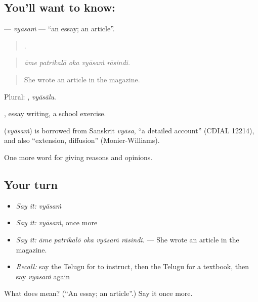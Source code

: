 \subsection*{You'll want to know: }
\textbf{} — \emph{vyāsaṁ} — \textquotedblleft{}an essay; an article\textquotedblright{}.

\begin{quote}
    .
\end{quote}

\begin{quote}
\emph{āme patrikalō oka vyāsaṁ rāsindi.}
\end{quote}

\begin{quote}
She wrote an article in the magazine.
\end{quote}

Plural: , \emph{vyāsālu}.

, essay writing, a school exercise.

\begin{cousinweb}
\textbf{} (\emph{vyāsaṁ}) is borrowed from Sanskrit \emph{vyāsa}, \textquotedblleft{}a detailed account\textquotedblright{} (CDIAL 12214), and also \textquotedblleft{}extension, diffusion\textquotedblright{} (Monier-Williams).
\end{cousinweb}

\begin{grammarlens}[title={What you've built}]
One more word for giving reasons and opinions.
\end{grammarlens}

\subsection*{Your turn}
\begin{itemize}
\raggedright
  \item \emph{Say it:} \emph{vyāsaṁ}
  \item \emph{Say it:} \emph{vyāsaṁ}, once more
  \item \emph{Say it:} \emph{āme patrikalō oka vyāsaṁ rāsindi.} — She wrote an article in the magazine.
  \item \emph{Recall:} say the Telugu for to instruct, then the Telugu for a textbook, then say \emph{vyāsaṁ} again
\end{itemize}

\begin{tcolorbox}[breakable,colback=teal!4,colframe=teal!35!black,title={Before you move on}]
What does  mean? (\textquotedblleft{}An essay; an article\textquotedblright{}.) Say it once more.
\end{tcolorbox}
